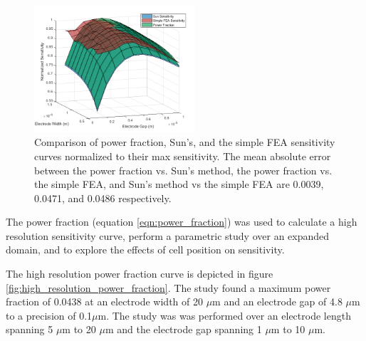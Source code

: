 \begin{figure}[h]
    \centering
    \includegraphics[width=0.53\textwidth]{images/normalizedSensitivityComp.png}
    \caption[Comparison of power fraction, Sun's, and the simple FEA sensitivity curves.]{Comparison of power fraction, Sun's, and the simple FEA sensitivity curves normalized to their max sensitivity. The mean absolute error between the power fraction vs. Sun's method, the power fraction vs. the simple FEA, and Sun's method vs the simple FEA are 0.0039, 0.0471, and 0.0486 respectively.}
    \label{fig:sun-simple-powerFrac-comp}
\end{figure}

\newpage

\par The power fraction (equation \ref{eqn:power_fraction}) was used to calculate a high resolution sensitivity curve, perform a parametric study over an expanded domain, and to explore the effects of cell position on sensitivity. 

\par The high resolution power fraction curve is depicted in figure \ref{fig:high_resolution_power_fraction}. The study found a maximum power fraction of 0.0438 at an electrode width of 20 $\mu$m and an electrode gap of 4.8 $\mu$m to a precision of 0.1$\mu$m. The study was was performed over an electrode length spanning 5 $\mu$m to 20 $\mu$m and the electrode gap spanning 1 $\mu$m to 10 $\mu$m. 

